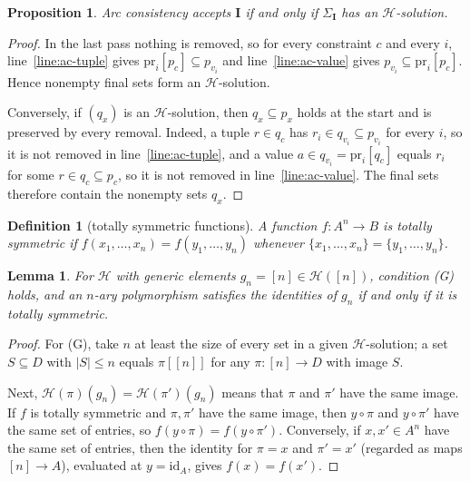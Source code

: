 \documentclass[11pt]{article}
\theoremstyle{plain}
\newtheorem{proposition}[theorem]{Proposition}
\newtheorem{lemma}[theorem]{Lemma}
\newtheorem{definition}[theorem]{Definition}
\theoremstyle{definition}
\newcommand{\pr}{\mathrm{pr}}
\newcommand{\id}{\mathrm{id}}
\newcommand{\bI}{\mathbf{I}}
\newcommand{\Hm}{\mathscr{H}}
\begin{document}
\begin{proposition}\label{prop:ac}
Arc consistency accepts $\bI$ if and only if $\Sigma_{\bI}$ has an $\Hm$-solution.
\end{proposition}

\begin{proof}
In the last pass nothing is removed, so for every constraint $c$ and every $i$, line~\ref{line:ac-tuple} gives $\pr_i[p_c]\subseteq p_{v_i}$ and line~\ref{line:ac-value} gives $p_{v_i}\subseteq\pr_i[p_c]$. Hence nonempty final sets form an $\Hm$-solution.

Conversely, if $(q_x)$ is an $\Hm$-solution, then $q_x\subseteq p_x$ holds at the start and is preserved by every removal. Indeed, a tuple $r\in q_c$ has $r_i\in q_{v_i}\subseteq p_{v_i}$ for every $i$, so it is not removed in line~\ref{line:ac-tuple}, and a value $a\in q_{v_i}=\pr_i[q_c]$ equals $r_i$ for some $r\in q_c\subseteq p_c$, so it is not removed in line~\ref{line:ac-value}. The final sets therefore contain the nonempty sets $q_x$.
\end{proof}

\begin{definition}[totally symmetric functions]
A function $f\colon A^n\to B$ is \emph{totally symmetric} if $f(x_1,\dots,x_n)=f(y_1,\dots,y_n)$ whenever $\{x_1,\dots,x_n\}=\{y_1,\dots,y_n\}$.
\end{definition}

\begin{lemma}\label{lem:gen-H}
For $\Hm$ with generic elements $g_n=[n]\in\Hm([n])$, condition (G) holds, and an $n$-ary polymorphism satisfies the identities of $g_n$ if and only if it is totally symmetric.
\end{lemma}

\begin{proof}
For (G), take $n$ at least the size of every set in a given $\Hm$-solution; a set $S\subseteq D$ with $|S|\leq n$ equals $\pi[[n]]$ for any $\pi\colon[n]\to D$ with image $S$.

Next, $\Hm(\pi)(g_n)=\Hm(\pi')(g_n)$ means that $\pi$ and $\pi'$ have the same image. If $f$ is totally symmetric and $\pi,\pi'$ have the same image, then $y\circ\pi$ and $y\circ\pi'$ have the same set of entries, so $f(y\circ\pi)=f(y\circ\pi')$. Conversely, if $x,x'\in A^n$ have the same set of entries, then the identity for $\pi=x$ and $\pi'=x'$ (regarded as maps $[n]\to A$), evaluated at $y=\id_A$, gives $f(x)=f(x')$.
\end{proof}
\end{document}
